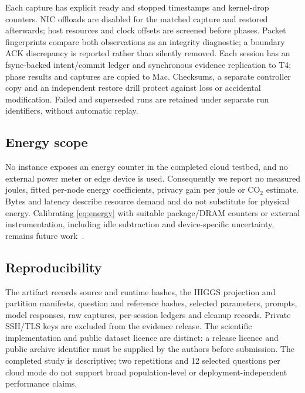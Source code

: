 Each capture has explicit ready and stopped timestamps and kernel-drop counters. NIC offloads are disabled for the matched capture and restored afterwards; host resources and clock offsets are screened before phases. Packet fingerprints compare both observations as an integrity diagnostic; a boundary ACK discrepancy is reported rather than silently removed. Each session has an fsync-backed intent/commit ledger and synchronous evidence replication to T4; phase results and captures are copied to Mac. Checksums, a separate controller copy and an independent restore drill protect against loss or accidental modification. Failed and superseded runs are retained under separate run identifiers, without automatic replay.

\subsection{Energy scope}\label{sec:energy}
No instance exposes an energy counter in the completed cloud testbed, and no external power meter or edge device is used. Consequently we report no measured joules, fitted per-node energy coefficients, privacy gain per joule or CO$_2$ estimate. Bytes and latency describe resource demand and do not substitute for physical energy. Calibrating \cref{eq:energy} with suitable package/DRAM counters or external instrumentation, including idle subtraction and device-specific uncertainty, remains future work~\cite{linux2026powercap}.

\subsection{Reproducibility}
The artifact records source and runtime hashes, the HIGGS projection and partition manifests, question and reference hashes, selected parameters, prompts, model responses, raw captures, per-session ledgers and cleanup records. Private SSH/TLS keys are excluded from the evidence release. The scientific implementation and public dataset licence are distinct: a release licence and public archive identifier must be supplied by the authors before submission. The completed study is descriptive; two repetitions and 12 selected questions per cloud mode do not support broad population-level or deployment-independent performance claims.
